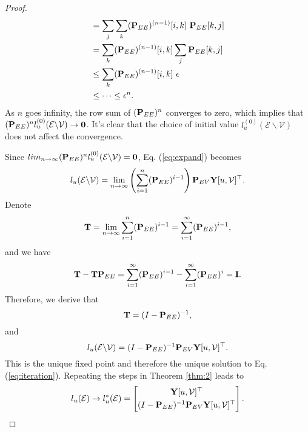 \documentclass[sigconf]{acmart}
\begin{document}
\begin{proof}
\begin{equation*}
\begin{split}
				&= \sum_j \sum_k ({\bf P}_{EE})^{(n-1)}[i, k] \ {\bf P}_{EE} [k, j]\\
				&= \sum_k ({\bf P}_{EE})^{(n-1)}[i, k] \sum_j {\bf P}_{EE} [k, j]\\
				&\leq \sum_k ({\bf P}_{EE})^{(n-1)}[i, k] \ \epsilon\\
				&\leq \cdots \leq \epsilon^n.
			\end{split}
			\end{equation*}
			As $n$ goes infinity, the row sum of $({\bf P}_{EE})^n$ converges to zero, which implies that $({\bf P}_{EE})^n l_u^{(0)}(\mathcal E \backslash \mathcal V) \rightarrow {\bf 0}$.
			It's clear that the choice of initial value $l_u^{(0)}(\mathcal E \backslash \mathcal V)$ does not affect the convergence.
			
			Since $lim_{n \rightarrow \infty} ({\bf P}_{EE})^n l_u^{(0)}(\mathcal E \backslash \mathcal V) = {\bf 0}$, Eq. (\ref{eq:expand}) becomes
			\begin{equation*}
				l_u(\mathcal E \backslash \mathcal V) = \lim_{n \rightarrow \infty} \left( \sum_{i=1}^n ({\bf P}_{EE})^{i-1} \right) {\bf P}_{EV} {\bf Y}[u, \mathcal V]^\top.
			\end{equation*}
			Denote
			\begin{equation*}
				{\bf T} = \lim_{n \rightarrow \infty} \sum_{i=1}^n ({\bf P}_{EE})^{i-1} = \sum_{i=1}^\infty ({\bf P}_{EE})^{i-1},
			\end{equation*}
			and we have
			\begin{equation*}
				{\bf T} - {\bf T} {\bf P}_{EE} = \sum_{i=1}^\infty ({\bf P}_{EE})^{i-1} - \sum_{i=1}^\infty ({\bf P}_{EE})^{i} = {\bf I}.			\end{equation*}
			Therefore, we derive that
			\begin{equation*}
				{\bf T} = (I - {\bf P}_{EE})^{-1},
			\end{equation*}
			and
			\begin{equation*}
				l_u(\mathcal E \backslash \mathcal V) = (I - {\bf P}_{EE})^{-1} {\bf P}_{EV} {\bf Y}[u, \mathcal V]^\top.
			\end{equation*}
			This is the unique fixed point and therefore the unique solution to Eq. (\ref{eq:iteration}).
			Repeating the steps in Theorem \ref{thm:2} leads to
			\begin{equation*}
				l_u(\mathcal E) \rightarrow l_u^*(\mathcal E) =
				\begin{bmatrix}
					{\bf Y}[u, \mathcal V]^\top\\[0.3 em]
					(I - {\bf P}_{EE})^{-1} {\bf P}_{EV} {\bf Y}[u, \mathcal V]^\top
				\end{bmatrix}.
			\end{equation*}
		\end{proof}
		
\end{document}
